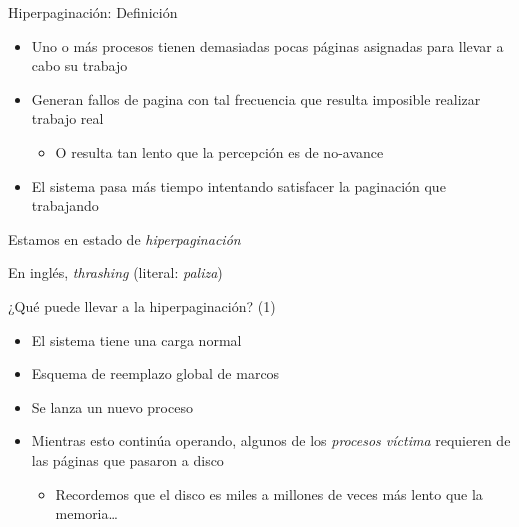 \documentclass[presentation]{beamer}
\newcommand{\rarrow}{$\rightarrow$\hskip 0.5em}
\begin{document}
\begin{frame}[label={sec:org3a3343d}]{Hiperpaginación: Definición}
\begin{itemize}
\item Uno o más procesos tienen demasiadas pocas páginas asignadas para
llevar a cabo su trabajo
\item Generan fallos de pagina con tal frecuencia que resulta imposible
realizar trabajo real
\begin{itemize}
\item O resulta tan lento que la percepción es de no-avance
\end{itemize}
\item El sistema pasa más tiempo intentando satisfacer la paginación que
trabajando
\end{itemize}
\begin{center}
Estamos en estado de \emph{hiperpaginación}

En inglés, \emph{thrashing} (literal: \emph{paliza})
\end{center}
\end{frame}

\begin{frame}[label={sec:orgc2a23e6}]{¿Qué puede llevar a la hiperpaginación? (1)}
\begin{itemize}
\item El sistema tiene una carga normal
\item Esquema de reemplazo global de marcos
\item Se lanza un nuevo proceso
\item Mientras esto continúa operando, algunos de los \emph{procesos víctima}
requieren de las páginas que pasaron a disco
\begin{itemize}
\item Recordemos que el disco es miles a millones de veces más lento
que la memoria\ldots{}
\end{itemize}
\end{itemize}
\end{frame}
\end{document}
